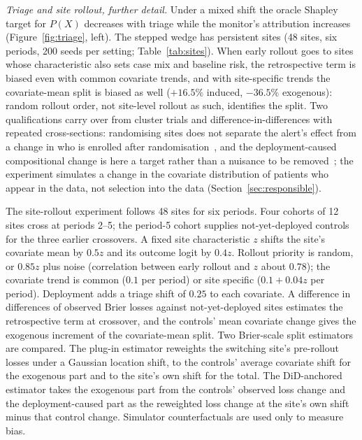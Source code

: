 \documentclass[letterpaper]{article} %
\begin{document}
\emph{Triage and site rollout, further detail.} Under a mixed shift the
oracle Shapley target for $P(X)$
decreases with triage while the monitor's attribution increases
(Figure~\ref{fig:triage}, left). The stepped wedge has persistent sites (48 sites, six periods,
200 seeds per setting; Table~\ref{tab:sites}). When early rollout goes
to sites whose characteristic also sets case mix and baseline risk, the
retrospective term is biased even with common
covariate trends, and with site-specific trends the covariate-mean split is
biased as well ($+16.5\%$ induced, $-36.5\%$ exogenous): random rollout order, not site-level rollout as such,
identifies the split. Two qualifications carry over from cluster trials and
difference-in-differences with repeated cross-sections: randomising sites
does not separate the alert's effect from a change in who is enrolled after
randomisation~\citep{papadogeorgou2025selection}, and the deployment-caused
compositional change is here a target rather than a nuisance to be
removed~\citep{santanna2026compositional}; the experiment simulates a change
in the covariate distribution of patients who appear in the data, not
selection into the data (Section~\ref{sec:responsible}).

The site-rollout experiment follows 48 sites for six periods. Four cohorts of 12 sites cross
at periods 2--5; the period-5 cohort supplies not-yet-deployed controls for the
three earlier crossovers. A fixed site characteristic $z$ shifts the site's
covariate mean by $0.5z$ and its outcome logit by $0.4z$. Rollout priority is
random, or $0.85z$ plus noise (correlation between early rollout and $z$ about
$0.78$); the covariate trend is common ($0.1$ per period) or site specific
($0.1 + 0.04z$ per period). Deployment adds a triage shift of $0.25$ to each
covariate. A difference in differences of observed Brier losses against
not-yet-deployed sites estimates the retrospective term at crossover, and the
controls' mean covariate change gives the exogenous increment of the
covariate-mean split. Two Brier-scale split estimators are compared. The
plug-in estimator reweights the switching site's pre-rollout losses under a
Gaussian location shift, to the controls' average covariate shift for the
exogenous part and to the site's own shift for the total. The DiD-anchored
estimator takes the exogenous part from the controls' observed loss change
and the deployment-caused part as the reweighted loss change at the site's
own shift minus that control change. Simulator counterfactuals are used only
to measure bias.
\end{document}
